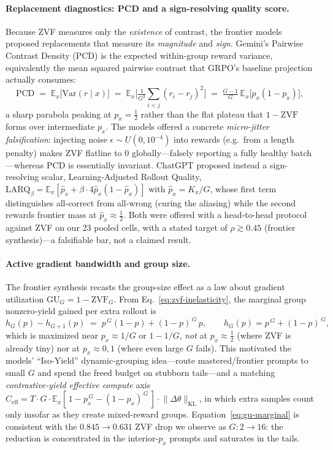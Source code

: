 \documentclass{article}
\begin{document}
\paragraph{Replacement diagnostics: PCD and a sign-resolving quality score.}
Because ZVF measures only the \emph{existence} of contrast, the frontier
models proposed replacements that measure its \emph{magnitude} and
\emph{sign}. Gemini's Pairwise Contrast Density (PCD) is the expected
within-group reward variance, equivalently the mean squared pairwise
contrast that GRPO's baseline projection actually consumes:
\begin{equation}
  \mathrm{PCD}
  \;=\; \mathbb{E}_{x}\!\big[\mathrm{Var}(r\mid x)\big]
  \;=\; \mathbb{E}_{x}\!\Big[\tfrac{1}{G^2}\!\sum_{i<j}(r_i-r_j)^2\Big]
  \;=\; \tfrac{G-1}{G}\,\mathbb{E}_{x}\!\big[p_x(1-p_x)\big],
  \label{eq:pcd}
\end{equation}
a sharp parabola peaking at $p_x=\tfrac12$ rather than the flat plateau
that $1-\mathrm{ZVF}$ forms over intermediate $p_x$. The models offered a
concrete \emph{micro-jitter falsification}: injecting noise
$\epsilon\sim U(0,10^{-4})$ into rewards (e.g.\ from a length penalty)
makes ZVF flatline to $0$ globally---falsely reporting a fully healthy
batch---whereas PCD is essentially invariant. ChatGPT proposed instead a
sign-resolving scalar, Learning-Adjusted Rollout Quality,
$\mathrm{LARQ}_\beta=\mathbb{E}_x[\hat p_x+\beta\cdot4\hat p_x(1-\hat p_x)]$
with $\hat p_x=K_x/G$, whose first term distinguishes all-correct from
all-wrong (curing the aliasing) while the second rewards frontier mass at
$\hat p_x\approx\tfrac12$. Both were offered with a head-to-head protocol
against ZVF on our $23$ pooled cells, with a stated target of
$\rho\gtrsim0.45$ (frontier synthesis)---a falsifiable bar, not a claimed
result.

\paragraph{Active gradient bandwidth and group size.}
The frontier synthesis recasts the group-size effect as a law about
gradient utilization $\mathrm{GU}_G=1-\mathrm{ZVF}_G$. From
Eq.~\eqref{eq:zvf-inelasticity}, the marginal group nonzero-yield gained
per extra rollout is
\begin{equation}
  h_G(p)-h_{G+1}(p) \;=\; p^{\,G}(1-p) + (1-p)^{\,G}\,p,
  \qquad h_G(p)=p^{\,G}+(1-p)^{\,G},
  \label{eq:gu-marginal}
\end{equation}
which is maximized near $p_x\approx 1/G$ or $1-1/G$, \emph{not} at
$p_x\approx\tfrac12$ (where ZVF is already tiny) nor at $p_x\approx 0,1$
(where even large $G$ fails). This motivated the models' ``Iso-Yield''
dynamic-grouping idea---route mastered/frontier prompts to small $G$ and
spend the freed budget on stubborn tails---and a matching
\emph{contrastive-yield effective compute} axis
$C_{\mathrm{eff}} = T\cdot G\cdot \mathbb{E}_x[\,1-p_x^{\,G}-(1-p_x)^{\,G}\,]\cdot\lVert\Delta\theta\rVert_{\mathrm{KL}}$,
in which extra samples count only insofar as they create mixed-reward
groups. Equation~\eqref{eq:gu-marginal} is consistent with the
$0.845\to0.631$ ZVF drop we observe as $G:2\to16$: the reduction is
concentrated in the interior-$p_x$ prompts and saturates in the tails.
\end{document}
